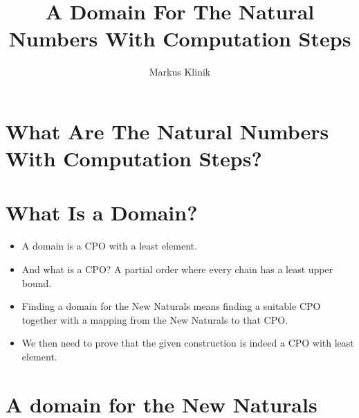 \documentclass[a4paper]{article}
\begin{document}
\title{A Domain For The Natural Numbers With Computation Steps}
\author{Markus Klinik}
\maketitle


\section{What Are The Natural Numbers With Computation Steps?}

\section{What Is a Domain?}

\begin{itemize}

\item A domain is a CPO with a least element.

\item And what is a CPO?  A partial order where every chain has a least upper bound.

\item Finding a domain for the New Naturals means finding a suitable CPO
together with a mapping from the New Naturals to that CPO.

\item We then need to prove that the given construction is indeed a CPO with
least element.

\end{itemize}

\section{A domain for the New Naturals}
\end{document}
